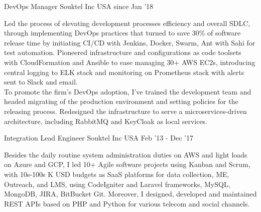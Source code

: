 
\begin{cventries}

  \cventry
    {DevOps Manager} %
    {Souktel Inc} %
    {USA} %
    {since Jan ’18} %
    {
      \begin{cvitems} %
        {Led the process of elevating development processes efficiency and overall SDLC, through implementing DevOps practices that turned to save 30\% of software release time by initiating CI/CD with Jenkins, Docker, Swarm, Ant with Sahi for test automation. Pioneered infrastructure and configurations as code toolsets with CloudFormation and Ansible to ease managing 30+ AWS EC2s, introducing central logging to ELK stack and monitoring on Prometheus stack with alerts sent to Slack and email.\\
        To promote the firm's DevOps adoption, I've trained the development team and headed migrating of the production environment and setting policies for the releasing process. Redesigned the infrastructure to serve a microservices-driven architecture, including RabbitMQ and KeyCloak as local services.}
      \end{cvitems}
    }

\cventry
    {Integration Lead Engineer} %
    {Souktel Inc} %
    {USA} %
    {Feb ’13 - Dec ’17} %
    {
      \begin{cvitems} %
        {Besides the daily routine system administration duties on AWS and light loads on Azure and GCP, I led 10+ Agile software projects using Kanban and Scrum, with 10s-100s K USD budgets as SaaS platforms for data collection, ME, Outreach, and LMS, using CodeIgniter and Laravel frameworks, MySQL, MongoDB, JIRA, BitBucket Git. Moreover, I designed, developed and maintained REST APIs based on PHP and Python for various telecom and social channels.}
      \end{cvitems}
    }


\end{cventries}
